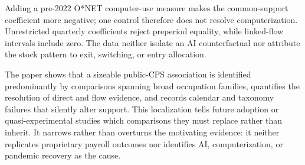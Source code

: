 Adding a pre-2022 O*NET computer-use measure makes the common-support coefficient more negative; one control therefore does not resolve computerization.  Unrestricted quarterly coefficients reject preperiod equality, while linked-flow intervals include zero.  The data neither isolate an AI counterfactual nor attribute the stock pattern to exit, switching, or entry allocation.

The paper shows that a sizeable public-CPS association is identified predominantly by comparisons spanning broad occupation families, quantifies the resolution of direct and flow evidence, and records calendar and taxonomy failures that silently alter support.  This localization tells future adoption or quasi-experimental studies which comparisons they must replace rather than inherit.  It narrows rather than overturns the motivating evidence: it neither replicates proprietary payroll outcomes nor identifies AI, computerization, or pandemic recovery as the cause.
